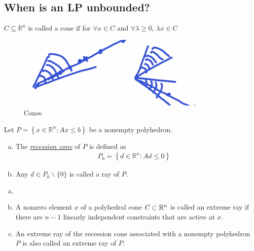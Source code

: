 \documentclass[11pt]{article}
\numberwithin{equation}{section}
\begin{document}
\subsection{When is an LP unbounded?}
\begin{definition}
    $C \subseteq \mathbb{R}^n$ is called a cone if for $\forall x \in C$ and $\forall \lambda \geq 0$, $\lambda x \in C$
\end{definition}

\begin{figure}[H]
    \centering
    \includegraphics[width=10cm]{images/6-ex-1.png}
    \caption{Cones}
\end{figure}

\begin{definition}
    Let $P=\left\{x \in \mathbb{R}^{n}: A x \leq b\right\}$ be a nonempty polyhedron. 
    \begin{enumerate}[(a)]
        \item The \underline{\textit{recession cone}} of $P$ is defined as \begin{align*}
            P_0=\left\{d \in \mathbb{R}^{n}: A d \leq 0\right\}
        \end{align*}
        \item Any $d \in P_0\backslash \{0\}$ is called a ray of $P$.
    \end{enumerate}
\end{definition}

\begin{definition}
    \begin{enumerate}[(a)]
        \item[]
        \item A nonzero element $x$ of a polyhedral cone $C \subset \mathbb R^{n}$ is called an extreme ray if there are $n-1$ linearly independent constraints that are active at $x$.
        \item An extreme ray of the recession cone associated with a nonempty polyhedron $P$ is also called an extreme ray of $P$.
    \end{enumerate}
\end{definition}
\end{document}
